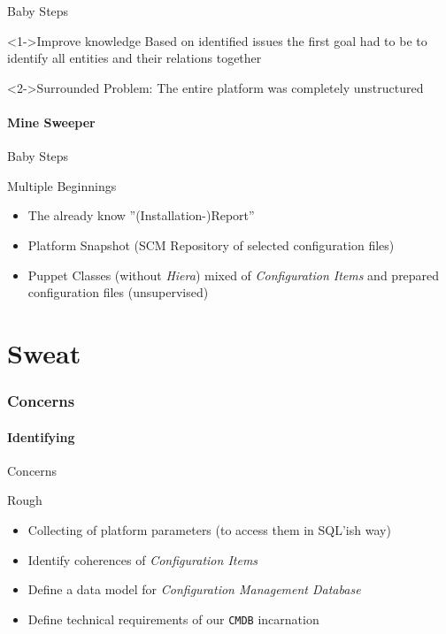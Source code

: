 \documentclass[ngerman,xcolor={table,dvipsnames},smaller,compress,hyperref={bookmarks,colorlinks}]{beamer}%
\begin{document}
\begin{frame}[fragile]{Baby Steps}
\begin{block}<1->{Improve knowledge}
Based on identified issues the first goal had to be to identify all entities and their relations together
\end{block}
\begin{block}<2->{Surrounded}
Problem: The entire platform was completely unstructured
\end{block}
\end{frame}

\subsection{Mine Sweeper}

\begin{frame}[fragile]{Baby Steps}
\begin{block}{Multiple Beginnings}
\begin{itemize}
\item The already know ''(Installation-)Report''
\item<2-> Platform Snapshot (SCM Repository of selected configuration files)
\item<3-> Puppet Classes (without \textit{Hiera}) mixed of \textit{Configuration Items} and prepared configuration files (unsupervised)
\end{itemize}
\end{block}
\end{frame}

\part{Sweat}

\section{Concerns}

\subsection{Identifying}

\begin{frame}[fragile]{Concerns}
\begin{block}{Rough}
\begin{itemize}
\item Collecting of platform parameters (to access them in SQL'ish way)
\item<2-> Identify coherences of \textit{Configuration Items}
\item<3-> Define a data model for \textit{Configuration Management Database}
\item<4-> Define technical requirements of our \texttt{CMDB} incarnation
\end{itemize}
\end{block}
\end{frame}
\end{document}
